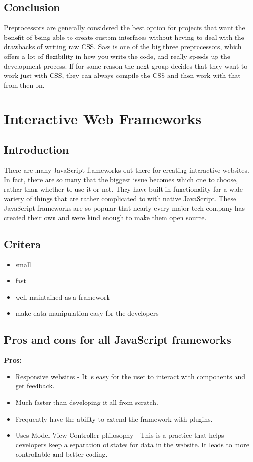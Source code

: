 \documentclass[draftclsnofoot,onecolumn,letterpaper,10pt,compsoc]{IEEEtran}
\begin{document}
  \subsection{Conclusion}

    Preprocessors are generally considered the best option for projects that want the benefit of being able to create custom interfaces without having to deal with the drawbacks of writing raw CSS.
    Sass is one of the big three preprocessors, which offers a lot of flexibility in how you write the code, and really speeds up the development process.
    If for some reason the next group decides that they want to work just with CSS, they can always compile the CSS and then work with that from then on.

\section{Interactive Web Frameworks}
  \subsection{Introduction}

    There are many JavaScript frameworks out there for creating interactive websites.
    In fact, there are so many that the biggest issue becomes which one to choose, rather than whether to use it or not.
    They have built in functionality for a wide variety of things that are rather complicated to with native JavaScript.
    These JavaScript frameworks are so popular that nearly every major tech company has created their own and were kind enough to make them open source.

  \subsection{Critera}
  \begin{itemize}
    \item small
    \item fast
    \item well maintained as a framework
    \item make data manipulation easy for the developers
  \end{itemize}


  \subsection{Pros and cons for all JavaScript frameworks}
    \textbf{Pros:}
    \begin{itemize}
      \item Responsive websites - It is easy for the user to interact with components and get feedback.
      \item Much faster than developing it all from scratch.
      \item Frequently have the ability to extend the framework with plugins.
      \item Uses Model-View-Controller philosophy - This is a practice that helps developers keep a separation of states for data in the website. It leads to more controllable and better coding.
    \end{itemize}
\end{document}
